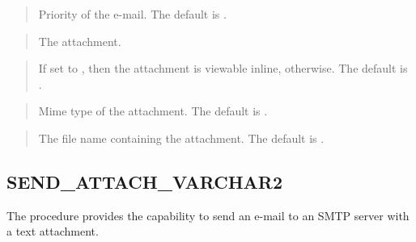 \documentclass[letterpaper,10pt,english,openany,oneside]{sphinxmanual}
\begin{document}
\newpage

\begin{quote}

Priority of the e-mail. The default is .
\end{quote}

\begin{quote}

The attachment.
\end{quote}

\begin{quote}

If set to , then the attachment is viewable inline,  otherwise.
The default is .
\end{quote}

\begin{quote}

Mime type of the attachment. The default is .
\end{quote}

\begin{quote}

The file name containing the attachment. The default is .
\end{quote}

\newpage


\subsection{SEND\_ATTACH\_VARCHAR2}
\label{\detokenize{utl_mail:send-attach-varchar2}}
The  procedure provides the capability to send an
e-mail to an SMTP server with a text attachment.

\end{document}
